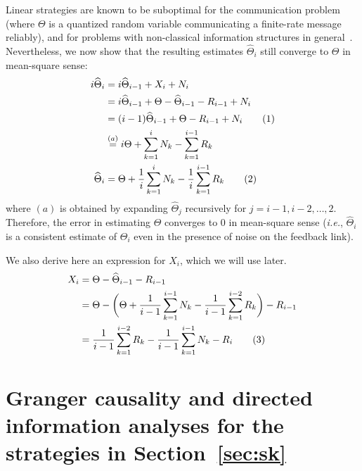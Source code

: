 \documentclass[letterpaper, 10pt, conference]{ieeeconf}
\newcommand\numberthis{\stepcounter{equation}\tag{\theequation}}
\begin{document}
Linear strategies are known to be suboptimal for the communication problem~\cite{YoungHanKimPaper} (where $\Theta$ is a quantized random variable communicating a finite-rate message reliably), and for problems with non-classical information structures in general~\cite{Witsenhausen68}. Nevertheless, we now show that the resulting estimates $\widehat{\Theta}_i$  still converge to $\Theta$ in mean-square sense:
\begin{align*}
	i\widehat\Theta_i &= i\widehat\Theta_{i-1} + X_i + N_i \\
					  &= i\widehat\Theta_{i-1} + \Theta - \widehat\Theta_{i-1} - R_{i-1} + N_i \\
					  &= (i-1) \widehat\Theta_{i-1} + \Theta - R_{i-1} + N_i \numberthis \label{eq:theta_hat_i-noisy-once} \\
					  &\overset{(a)}{=} i\Theta + \sum_{k=1}^i N_k - \sum_{k=1}^{i-1} R_k \\
	\widehat\Theta_i  &= \Theta + \frac{1}{i} \sum_{k=1}^i N_k - \frac{1}{i} \sum_{k=1}^{i-1} R_k \numberthis \label{eq:theta_hat_i-noisy}
\end{align*}
where $(a)$ is obtained by expanding $\widehat{\Theta}_j$ recursively for $j=i-1,i-2,\ldots,2$. Therefore, the error in estimating $\Theta$ converges to $0$ in mean-square sense (\textit{i.e.}, $\widehat{\Theta}_i$ is a consistent estimate of $\Theta_i$ even in the presence of noise on the feedback link).

We also derive here an expression for $X_i$, which we will use later.
\begin{align*}
	X_i &= \Theta - \widehat\Theta_{i-1} - R_{i-1} \\
	&= \Theta - \bigg( \Theta + \frac{1}{i-1} \sum_{k=1}^{i-1} N_k - \frac{1}{i-1} \sum_{k=1}^{i-2} R_k \bigg) - R_{i-1} \\
	&= \frac{1}{i-1} \sum_{k=1}^{i-2} R_k - \frac{1}{i-1} \sum_{k=1}^{i-1} N_k - R_{i} \numberthis \label{eq:x_i-noisy}
\end{align*}


\section{Granger causality and directed information analyses for the strategies in Section~\ref{sec:sk}}
\label{sec:analytical-results}

\end{document}
